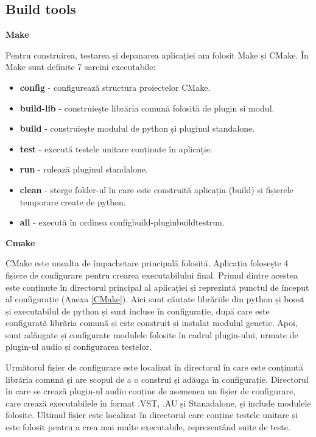     \subsection{Build tools}
        \noindent \textbf{Make} \par
            \noindent Pentru construirea, testarea și depanarea aplicației am folosit Make și CMake. În Make sunt definite 7 sarcini executabile:
            \begin{itemize}
                \item \textbf{config} - configurează structura proiectelor CMake.
                \item \textbf{build-lib} - construiește librăria comună folosită de plugin si modul.
                \item \textbf{build} - construiește modulul de python și pluginul standalone.
                \item \textbf{test} - execută testele unitare conținute în aplicație.
                \item \textbf{run} - rulează pluginul standalone.
                \item \textbf{clean} - șterge folder-ul în care este construită aplicația (build) și fișierele temporare create de python.
                \item \textbf{all} - execută în ordinea config\rightarrow build-plugin\rightarrow build\rightarrow test\rightarrow run.
            \end{itemize}
        \noindent \textbf{Cmake} \par
            \noindent CMake este unealta de împachetare principală folosită. Aplicația folosește 4 fișiere de configurare pentru crearea executabilului final. Primul dintre acestea este conținute în directorul principal al aplicației și reprezintă punctul de început al configurație (Anexa \ref{CMake}). Aici sunt căutate librăriile din python și boost și executabilul de python și sunt incluse în configurație, după care este configurată librăria comună și este construit și instalat modulul genetic. Apoi, sunt adăugate și configurate modulele folosite în cadrul plugin-ului, urmate de plugin-ul audio și configurarea testelor. \par
            Următorul fișier de configurare este localizat în directorul în care este conținută librăria comună și are scopul de a o construi și adăuga în configurație. Directorul în care se crează plugin-ul audio conține de asemenea un fișier de configurare, care crează executabilele în format .VST, .AU și Stanadalone, și include modulele folosite. Ultimul fișier este localizat în directorul care conține testele unitare și este folosit pentru a crea mai multe executabile, reprezentând suite de teste.
        
